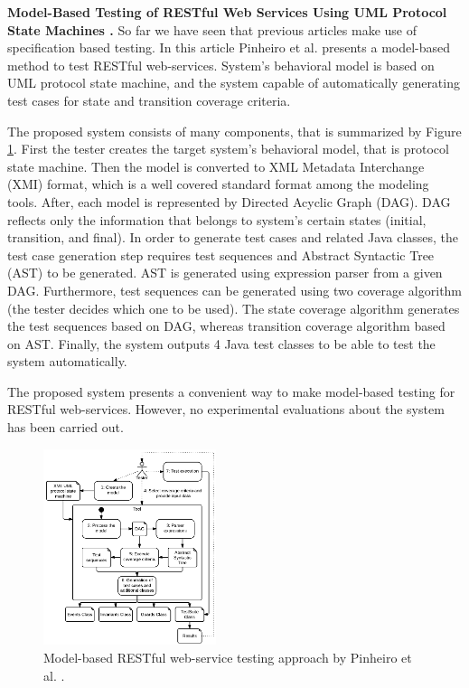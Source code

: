 \documentclass[english]{tktltiki}
\begin{document}
\textbf{Model-Based Testing of RESTful Web Services Using UML Protocol State Machines \cite{pinheiro2013model}.} So far we have seen that previous articles make use of specification based testing. In this article Pinheiro et al. \cite{pinheiro2013model} presents a model-based method to test RESTful web-services. System's behavioral model is based on UML protocol state machine, and the system capable of automatically generating test cases for state and transition coverage criteria.

The proposed system consists of many components, that is summarized by Figure \ref{fig:uml_system}. First the tester creates the target system's behavioral model, that is protocol state machine. Then the model is converted to XML Metadata Interchange (XMI) format, which is a well covered standard format among the modeling tools. After, each model is represented by Directed Acyclic Graph (DAG). DAG reflects only the information that belongs to system's certain states (initial, transition, and final). In order to generate test cases and related Java classes, the test case generation step requires test sequences and Abstract Syntactic Tree (AST) to be generated. AST is generated using expression parser from a given DAG. Furthermore, test sequences can be generated using two coverage algorithm (the tester decides which one to be used). The state coverage algorithm generates the test sequences based on DAG, whereas transition coverage algorithm based on AST. Finally, the system outputs 4 Java test classes to be able to test the system automatically.

The proposed system presents a convenient way to make model-based testing for RESTful web-services. However, no experimental evaluations about the system has been carried out.

\begin{figure}[h]
	\begin{center}
		\includegraphics[width=0.45\textwidth]{images/uml_system.png}
		\caption{ Model-based RESTful web-service testing approach by Pinheiro et al. \cite{pinheiro2013model}. }
		\label{fig:uml_system}
	\end{center}
\end{figure}
\end{document}
